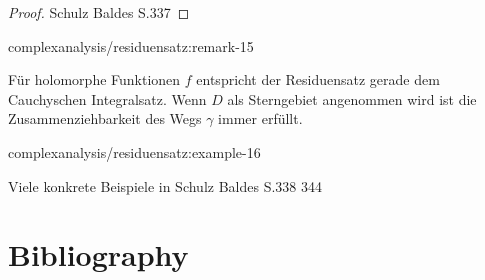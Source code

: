 \documentclass[letterpaper,10pt,german]{jupyterBook}
\begin{document}
\begin{proof}
 Schulz Baldes S.337
\end{proof}
\begin{remark}{}{complexanalysis/residuensatz:remark-15}



\par
Für holomorphe Funktionen \(f\) entspricht der Residuensatz gerade dem Cauchyschen Integralsatz.
Wenn \(D\) als Sterngebiet angenommen wird ist die Zusammenziehbarkeit des Wegs \(\gamma\) immer erfüllt.
\end{remark}
\begin{example}{}{complexanalysis/residuensatz:example-16}



\par
Viele konkrete Beispiele in Schulz Baldes S.338 344
\end{example}


\chapter{Bibliography}
\label{\detokenize{references:bibliography}}\label{\detokenize{references::doc}}
\par
\end{document}
